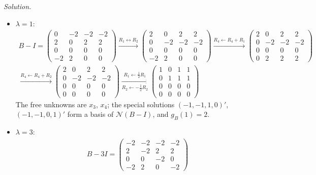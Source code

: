 \documentclass[12pt]{article}
\theoremstyle{definition}
\newenvironment{solution}{\par\noindent\textit{Solution.}\ }{\par\smallskip}
\begin{document}
\begin{solution}
\begin{itemize}
\[\begin{aligned}
&=(t-1)\Bigl((t-1)\bigl((t-1)^2-4\bigr)-2\bigl(-2(t-1)+4\bigr)+2\bigl(4-2(t-1)\bigr)\Bigr)\\
&=(t-1)\bigl((t-1)(t-3)(t+1)+4(t-1)-8+8-4(t-1)\bigr)\\
&=(t-1)^2(t-3)(t+1)
\end{aligned}
\]
So \(p_B=(t-1)^2(t-3)(t+1)\): the eigenvalues are \(1\), \(1\), \(3\), \(-1\), with \(a_B(1)=2\).
\item \(\lambda=1\):
\[
\begin{gathered}
B-I=\begin{pmatrix}0&-2&-2&-2\\2&0&2&2\\0&0&0&0\\-2&2&0&0\end{pmatrix}
\xrightarrow{R_1\leftrightarrow R_2}
\begin{pmatrix}2&0&2&2\\0&-2&-2&-2\\0&0&0&0\\-2&2&0&0\end{pmatrix}
\xrightarrow{R_4\leftarrow R_4+R_1}
\begin{pmatrix}2&0&2&2\\0&-2&-2&-2\\0&0&0&0\\0&2&2&2\end{pmatrix}
\\
\xrightarrow{R_4\leftarrow R_4+R_2}
\begin{pmatrix}2&0&2&2\\0&-2&-2&-2\\0&0&0&0\\0&0&0&0\end{pmatrix}
\xrightarrow[R_2\leftarrow-\frac12R_2]{R_1\leftarrow\frac12R_1}
\begin{pmatrix}1&0&1&1\\0&1&1&1\\0&0&0&0\\0&0&0&0\end{pmatrix}
\end{gathered}
\]
The free unknowns are \(x_3\), \(x_4\); the special solutions \((-1,-1,1,0)'\), \((-1,-1,0,1)'\) form a basis of
\(\mathcal N(B-I)\), and \(g_B(1)=2\).
\item \(\lambda=3\):
\[
\begin{gathered}
B-3I=\begin{pmatrix}-2&-2&-2&-2\\2&-2&2&2\\0&0&-2&0\\-2&2&0&-2\end{pmatrix}

\end{gathered}\]
\end{itemize}
\end{solution}
\end{document}
